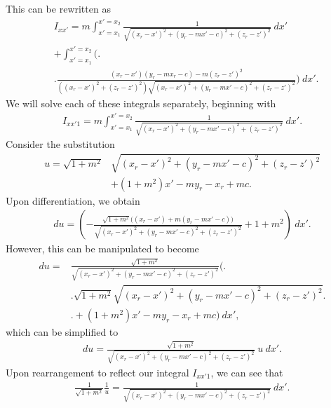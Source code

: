 This can be rewritten as
\begin{align}
    &I_{xx'} = m\int_{x'=x_1}^{x'=x_2} \frac{1}{\sqrt{\left(x_r-x'\right)^2+\left(y_r-mx'-c\right)^2+\left(z_r-z'\right)^2}}\ dx' \nonumber \\
    & + \int_{x'=x_1}^{x'=x_2} \Bigg( \Bigg. \nonumber \\
    & \Bigg. \frac{\left(x_r-x'\right)\left(y_r-mx_r-c\right) - m\left(z_r-z'\right)^2}{\left(\left(x_r-x'\right)^2+\left(z_r-z'\right)^2\right)\sqrt{\left(x_r-x'\right)^2+\left(y_r-mx'-c\right)^2+\left(z_r-z'\right)^2}} \Bigg) \ dx' \text{.}
\end{align}
We will solve each of these integrals separately, beginning with
\begin{align}
    I_{xx'1} = m\int_{x'=x_1}^{x'=x_2} \frac{1}{\sqrt{\left(x_r-x'\right)^2+\left(y_r-mx'-c\right)^2+\left(z_r-z'\right)^2}}\ dx' \text{.}
\end{align}
Consider the substitution
\begin{align}
    u = \sqrt{1+m^2}&\sqrt{\left(x_r-x'\right)^2+\left(y_r-mx'-c\right)^2+\left(z_r-z'\right)^2} \nonumber \\
    & + \left(1+m^2\right)x'-my_r-x_r+mc \text{.}
\end{align}
Upon differentiation, we obtain
\begin{align}
    du = \left(-\frac{\sqrt{1+m^2}\bigg(\left(x_r-x'\right)+m\left(y_r-mx'-c\right)\bigg)}{\sqrt{\left(x_r-x'\right)^2+\left(y_r-mx'-c\right)^2+\left(z_r-z'\right)^2}} + 1+m^2\right)\ dx' \text{.}
\end{align}
However, this can be manipulated to become
\begin{align}
    du =& \frac{\sqrt{1+m^2}}{\sqrt{\left(x_r-x'\right)^2+\left(y_r-mx'-c\right)^2+\left(z_r-z'\right)^2}} \Bigg( \Bigg. \nonumber \\
    & \Bigg. \sqrt{1+m^2}\sqrt{\left(x_r-x'\right)^2+\left(y_r-mx'-c\right)^2+\left(z_r-z'\right)^2} \Bigg. \nonumber \\
    & \Bigg. + \left(1+m^2\right)x' - my_r - x_r + mc \Bigg)\ dx' \text{,}
\end{align}
which can be simplified to
\begin{align}
    du = \frac{\sqrt{1+m^2}}{\sqrt{\left(x_r-x'\right)^2+\left(y_r-mx'-c\right)^2+\left(z_r-z'\right)^2}}\ u\ dx' \text{.}
\end{align}
Upon rearrangement to reflect our integral \(I_{xx'1}\), we can see that
\begin{align}
    \frac{1}{\sqrt{1+m^2}}\frac{1}{u} = \frac{1}{\sqrt{\left(x_r-x'\right)^2+\left(y_r-mx'-c\right)^2+\left(z_r-z'\right)^2}}\ dx' \text{.}
\end{align}
